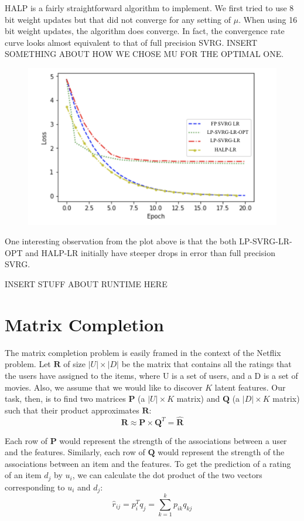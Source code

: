 \documentclass{article}
\begin{document}
HALP is a fairly straightforward algorithm to implement. We first tried to use 8 bit weight updates but that did not converge for any setting of $\mu$. When using 16 bit weight updates, the algorithm does converge. In fact, the convergence rate curve looks almost equivalent to that of full precision SVRG. INSERT SOMETHING ABOUT HOW WE CHOSE MU FOR THE OPTIMAL ONE. 

\begin{figure}[ht!]
    \centering
    \includegraphics[width=.5\textwidth]{pic3.png}
\end{figure}

One interesting observation from the plot above is that the both LP-SVRG-LR-OPT and HALP-LR initially have steeper drops in error than full precision SVRG. 

INSERT STUFF ABOUT RUNTIME HERE

\section{Matrix Completion}
The matrix completion problem is easily framed in the context of the Netflix problem. Let $\mathbf{R}$ of size $|U| \times |D|$ be the matrix that contains all the ratings that the users have assigned to the items, where U is a set of users, and a D is a set of movies. Also, we assume that we would like to discover $K$ latent features. Our task, then, is to find two matrices $\mathbf{P}$ (a $|U| \times K$ matrix) and $\mathbf{Q}$ (a $|D| \times K$ matrix) such that their product approximates $\mathbf{R}$:
\begin{equation}
\mathbf{R} \approx \mathbf{P} \times \mathbf{Q}^T = \hat{\mathbf{R}}
\end{equation}

Each row of $\mathbf{P}$ would represent the strength of the associations between a user and the features. Similarly, each row of $\mathbf{Q}$ would represent the strength of the associations between an item and the features. To get the prediction of a rating of an item $d_j$ by $u_i$, we can calculate the dot product of the two vectors corresponding to $u_i$ and $d_j$:
\begin{equation}
\hat{r}_{ij} = p_i^T q_j = \sum_{k=1}^k{p_{ik}q_{kj}}
\end{equation}
\end{document}
